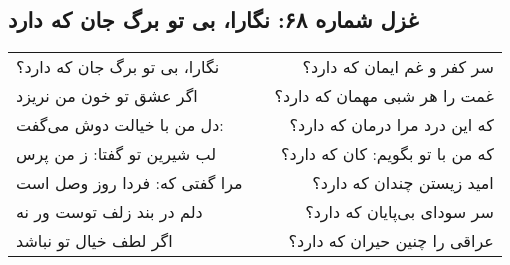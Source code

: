 \begin{center}
\section*{غزل شماره ۶۸: نگارا، بی تو برگ جان که دارد}
\label{sec:068}
\begin{longtable}{l p{0.5cm} r}
نگارا، بی تو برگ جان که دارد؟
&&
سر کفر و غم ایمان که دارد؟
\\
اگر عشق تو خون من نریزد
&&
غمت را هر شبی مهمان که دارد؟
\\
دل من با خیالت دوش می‌گفت:
&&
که این درد مرا درمان که دارد؟
\\
لب شیرین تو گفتا: ز من پرس
&&
که من با تو بگویم: کان که دارد؟
\\
مرا گفتی که: فردا روز وصل است
&&
امید زیستن چندان که دارد؟
\\
دلم در بند زلف توست ور نه
&&
سر سودای بی‌پایان که دارد؟
\\
اگر لطف خیال تو نباشد
&&
عراقی را چنین حیران که دارد؟
\\
\end{longtable}
\end{center}
